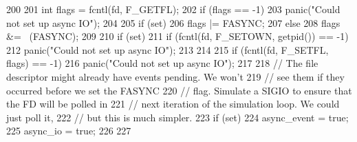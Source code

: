 \begin{DoxyCode}
200 {
201     int flags = fcntl(fd, F_GETFL);
202     if (flags == -1)
203         panic("Could not set up async IO");
204 
205     if (set)
206         flags |= FASYNC;
207     else
208         flags &= ~(FASYNC);
209 
210     if (set) {
211       if (fcntl(fd, F_SETOWN, getpid()) == -1)
212         panic("Could not set up async IO");
213     }
214 
215     if (fcntl(fd, F_SETFL, flags) == -1)
216         panic("Could not set up async IO");
217 
218     // The file descriptor might already have events pending. We won't
219     // see them if they occurred before we set the FASYNC
220     // flag. Simulate a SIGIO to ensure that the FD will be polled in
221     // next iteration of the simulation loop. We could just poll it,
222     // but this is much simpler.
223     if (set) {
224         async_event = true;
225         async_io = true;
226     }
227 }
\end{DoxyCode}


